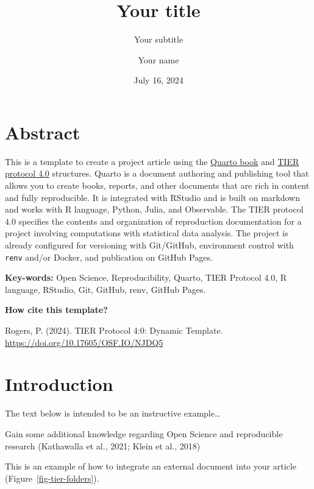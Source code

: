 \documentclass[
  a4paper,
]{article}
\title{Your title}
\subtitle{Your subtitle}
\author{Your name}
\date{July 16, 2024}
\begin{document}
\maketitle


\section*{Abstract}\label{abstract}


This is a template to create a project article using the
\href{https://quarto.org/docs/books/}{Quarto book} and
\href{https://www.projecttier.org/tier-protocol/protocol-4-0/}{TIER
protocol 4.0} structures. Quarto is a document authoring and publishing
tool that allows you to create books, reports, and other documents that
are rich in content and fully reproducible. It is integrated with
RStudio and is built on markdown and works with R language, Python,
Julia, and Observable. The TIER protocol 4.0 specifies the contents and
organization of reproduction documentation for a project involving
computations with statistical data analysis. The project is already
configured for versioning with Git/GitHub, environment control with
\texttt{renv} and/or Docker, and publication on GitHub Pages.

\textbf{Key-words:} Open Science, Reproducibility, Quarto, TIER Protocol
4.0, R language, RStudio, Git, GitHub, renv, GitHub Pages.

\textbf{How cite this template?}

Rogers, P. (2024). TIER Protocol 4:0: Dynamic Template.
\url{https://doi.org/10.17605/OSF.IO/NJDQ5}


\section{Introduction}\label{introduction}

The text below is intended to be an instructive example\ldots{}

Gain some additional knowledge regarding Open Science and reproducible
research (Kathawalla et al., 2021; Klein et al., 2018)

This is an example of how to integrate an external document into your
article (Figure~\ref{fig-tier-folders}).
\end{document}
